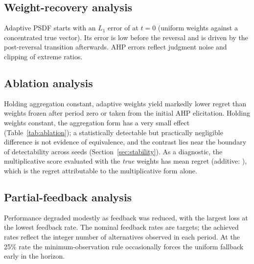 \documentclass[12pt,a4paper]{article}
\begin{document}
\begin{table}[t]
\centering\small
\caption{Paired inference for prespecified comparisons (mean difference of replication-level mean regret, first minus second method). A negative difference indicates lower mean regret for the first-named method; a positive difference indicates lower regret for adaptive PSDF.}\label{tab:paired}

\end{table}

\subsection{Weight-recovery analysis}
\begin{table}[t]
\centering\small
\caption{Weight-recovery results (mean $L_1$ error of normalized benefit weights).}\label{tab:weights}

\end{table}
Adaptive PSDF starts with an $L_1$ error of \LOneZero{} at $t=0$ (uniform weights against a concentrated true vector). Its error is low before the reversal and is driven by the post-reversal transition afterwards. AHP errors reflect judgment noise and clipping of extreme ratios.

\subsection{Ablation analysis}
\begin{table}[t]
\centering\small
\caption{Ablation results (paired difference relative to adaptive weights with multiplicative risk).}\label{tab:ablation}

\end{table}
Holding aggregation constant, adaptive weights yield markedly lower regret than weights frozen after period zero or taken from the initial AHP elicitation. Holding weights constant, the aggregation form has a very small effect (Table~\ref{tab:ablation}); a statistically detectable but practically negligible difference is not evidence of equivalence, and the contrast lies near the boundary of detectability across seeds (Section~\ref{sec:stability}). As a diagnostic, the multiplicative score evaluated with the \emph{true} weights has mean regret \OracleMultRegret{} (additive: \OracleAddRegret{}), which is the regret attributable to the multiplicative form alone.

\subsection{Partial-feedback analysis}
\begin{table}[t]
\centering\small
\caption{Partial-feedback results for adaptive PSDF.}\label{tab:partial}

\end{table}
Performance degraded modestly as feedback was reduced, with the largest loss at the lowest feedback rate. The nominal feedback rates are targets; the achieved rates reflect the integer number of alternatives observed in each period. At the 25\% rate the minimum-observation rule occasionally forces the uniform fallback early in the horizon.
\end{document}
